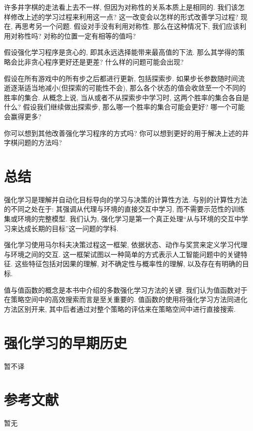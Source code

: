 \begin{exer}[对称性]
许多井字棋的走法看上去不一样, 但因为对称性的关系本质上是相同的. 我们该怎样修改上述的学习过程来利用这一点? 这一改变会以怎样的形式改善学习过程? 现在, 再思考另一个问题. 假设对手没有利用对称性. 那么在这种情况下, 我们应该利用对称性吗? 对称的位置一定有相等的值吗?
\end{exer}

\begin{exer}[贪心的下法]
假设强化学习程序是贪心的, 即其永远选择能带来最高值的下法. 那么其学得的策略会比非贪心程序更好还是更差? 什么样的问题可能会出现?
\end{exer}

\begin{exer}[从探索中学习]
假设在所有游戏中的所有步之后都进行更新, 包括探索步. 如果步长参数随时间流逝逐渐适当地减小(但探索的可能性不会), 那么各个状态的值会收敛至一个不同的胜率的集合. 从概念上说, 当从或者不从探索步中学习时, 这两个胜率的集合各自是什么? 假设我们继续做出探索步, 那么哪一个胜率的集合可能会更好? 哪一个可能会赢得更多?
\end{exer}

\begin{exer}[其他改进]
你可以想到其他改善强化学习程序的方式吗? 你可以想到更好的用于解决上述的井字棋问题的方法吗?
\end{exer}

\section{总结}\label{sec:1.6}

强化学习是理解并自动化目标导向的学习与决策的计算性方法. 与别的计算性方法的不同之处在于: 其强调从代理与环境的直接交互中学习, 而不需要示范性的训练集或环境的完整模型. 我们认为, 强化学习是第一个真正处理``从与环境的交互中学习来达成长期的目标''这一问题的学科. 

强化学习使用马尔科夫决策过程这一框架, 依据状态、动作与奖赏来定义学习代理与环境之间的交互. 这一框架试图以一种简单的方式表示人工智能问题中的关键特征. 这些特征包括对因果的理解, 对不确定性与概率性的理解, 以及存在有明确的目标.

值与值函数的概念是本书中介绍的多数强化学习方法的关键. 我们认为值函数对于在策略空间中的高效搜索而言是至关重要的. 值函数的使用将强化学习方法同进化方法区别开来, 其中后者通过对整个策略的评估来在策略空间中进行直接搜索.

\section{强化学习的早期历史}\label{sec:1.7}

暂不译

\section*{参考文献}

暂无

